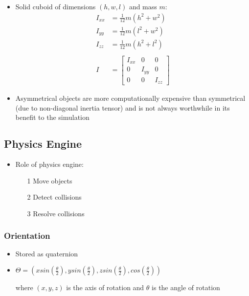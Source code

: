 \documentclass[a4paper]{article}
\begin{document}
\begin{itemize}
  \item
    Solid cuboid of dimensions $(h, w, l)$ and mass $m$:
    \begin{align*}
      I_{xx} &= \frac{1}{12} m \left( h^{2} + w^{2} \right) \\
      I_{yy} &= \frac{1}{12} m \left( l^{2} + w^{2} \right) \\
      I_{zz} &= \frac{1}{12} m \left( h^{2} + l^{2} \right) \\
      \\
      I &= \left [
        \begin{array}{ccc}
          I_{xx} & 0      & 0      \\
          0      & I_{yy} & 0      \\
          0      & 0      & I_{zz}
        \end{array}
      \right ]
    \end{align*}

  \item
    Asymmetrical objects are more computationally expensive than symmetrical
    (due to non-diagonal inertia tensor) and is not always worthwhile in its
    benefit to the simulation

\end{itemize}

\subsection{Physics Engine}

\begin{itemize}
  \item
    Role of physics engine:

    \begin{enumerate}
      \item[1]
        Move objects

      \item[2]
        Detect collisions

      \item[3]
        Resolve collisions

    \end{enumerate}

\end{itemize}

\subsubsection{Orientation}

\begin{itemize}
  \item
    Stored as quaternion

  \item
    $\Theta = \left(
      xsin\left(\frac{\theta}{2}\right),
      ysin\left(\frac{\theta}{2}\right),
      zsin\left(\frac{\theta}{2}\right),
      cos\left(\frac{\theta}{2}\right)
    \right)$

    where $(x, y, z)$ is the axis of rotation and $\theta$ is the angle of
    rotation

\end{itemize}
\end{document}

